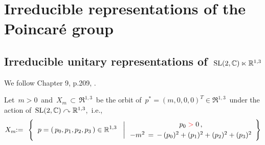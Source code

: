 

\chapter{Irreducible representations of the Poincaré group}
\setcounter{theorem}{0}
\setcounter{equation}{0}


\renewcommand{\theenumi}{\roman{enumi}}
\renewcommand{\labelenumi}{\textnormal{(\theenumi)}$\;\;$}



\vskip 1.0cm

\vskip 1.0cm

\vskip 1.0cm

\vskip 1.0cm

%


\vskip 1.0cm
\section{Irreducible unitary representations of \,$\textnormal{SL}(2,\mathbb{C}) \ltimes \mathbb{R}^{1,3}$}


We follow Chapter 9, p.209, \cite{Talagrand2022}.

\vskip 0.5cm
\noindent
Let \,$m > 0$\, and
\,$X_{m} \,\subset\, \Re^{1,3}$\,
be the orbit of
\,$p^{*} = (m,0,0,0)^{T} \in \Re^{1,3}$\,
under the action of
\,$\textnormal{SL}(2,\mathbb{C}) \curvearrowright \mathbb{R}^{1,3}$,\,
i.e.,
\begin{eqnarray*}
X_{m}
& \!\! := \!\! &
	\left\{\;\,
		\left.
		p = (\,p_{0},p_{1},p_{2},p_{3}\,)
		\overset{{\color{white}1}}{\in}
		\Re^{1,3}
		\;\;\;\right\vert
		\begin{array}{c}
			p_{0} \;{\color{red}>}\; 0\,,
			\\
			-m^{2} \, \overset{{\color{white}1}}{=} \, -\,(p_{0})^{2} + (p_{1})^{2} + (p_{2})^{2} + (p_{3})^{2}
			\end{array}
		\right\}
\end{eqnarray*}

